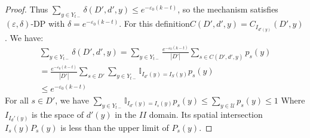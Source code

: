 \begin{proof}
Thus $\sum_{ y\in Y_{t-}} \delta (D', d',y) \leq e^{-\varepsilon_0(k-t)}$, so the mechanism satisfies $(\varepsilon,\delta)$-DP with $\delta = e^{-\varepsilon_0(k-t)}$. For this definition$C(D', d',y)=C_{I_{d'(y)}}(D',y)$. We have: 
    \begin{equation}
\begin{aligned}
\sum_{ y\in Y_{t-}} \delta (D', d',y) 	 = \sum_{ y\in Y_{t-}} \frac{e^{-\varepsilon_0(k-t)}}{|D'|}\sum_{ s\in C(D', d',y)} p_s(y)  \\
    =	\frac{e^{-\varepsilon_0(k-t)}}{|D'|} \sum_{s \in D'} \sum_{y\in Y_{t-}} \mathbb{I}_{I_{d'} (y) = I_S(y)}   p_s(y) \\
        \leq e^{-\varepsilon_0(k-t)}
\end{aligned}
\end{equation}
For all $s\in D'$, we have $\sum_{y\in Y_{t-}} \mathbb{I}_{I_{d'}(y) =I_s(y)}   p_s(y) \leq \sum_{y\in \mathcal{U}} p_s(y) \leq  1$
Where $I_{I_d '(y)}$ is the space of $d' (y)$ in the $II$ domain. Its spatial intersection $I_s (y) P_s (y)$ is less than the upper limit of $P_s (y)$.
	
\end{proof}

